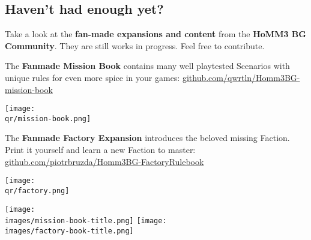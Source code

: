 \begin{multicols}{2}
\subsection*{Haven't had enough yet?}
Take a look at the \textbf{fan-made expansions and content} from the \textbf{HoMM3 BG Community}.
They are still works in progress.
Feel free to contribute.
  \begin{itemize}
    \begin{minipage}{5cm}
      \item The \textbf{Fanmade Mission Book} contains many well playtested Scenarios with unique rules for even more spice in your games:
      \mbox{\footnotesize \href{https://github.com/qwrtln/Homm3BG-mission-book}{github.com/qwrtln/Homm3BG-mission-book}}
    \end{minipage}
    \hfill
    \begin{minipage}{2cm}
        \begin{center}
            \texttt{[image: \\qr/mission-book.png]}
            \scriptsize {}
        \end{center}
    \end{minipage}\par
    \smallskip
    \begin{minipage}{5cm}
      \item The \textbf{Fanmade Factory Expansion} introduces the beloved missing Faction.
      Print it yourself and learn a new Faction to master:
      {\footnotesize \href{https://github.com/piotrbruzda/Homm3BG-FactoryRulebook}{github.com/piotrbruzda/Homm3BG-FactoryRulebook}}
    \end{minipage}
    \hfill
    \begin{minipage}{2cm}
        \begin{center}
            \vspace*{-1em}
            \texttt{[image: \\qr/factory.png]}
            \scriptsize {}
        \end{center}
    \end{minipage}\par
    \smallskip
  \end{itemize}
  \begin{center}
    \hfill
    \texttt{[image: \\images/mission-book-title.png]}
    \texttt{[image: \\images/factory-book-title.png]}
  \end{center}
  \begin{itemize}

\end{itemize}
\end{multicols}
